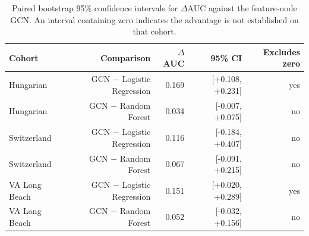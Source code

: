 \begin{table}[t]
\centering
\caption{Paired bootstrap 95\% confidence intervals for $\Delta$AUC against the feature-node GCN. An interval containing zero indicates the advantage is not established on that cohort.}
\label{tab:extbootdelta}
\footnotesize
\begin{tabular}{lrrrr}
\toprule
Cohort & Comparison & $\Delta$AUC & 95\% CI & Excludes zero \\
\midrule
Hungarian & GCN $-$ Logistic Regression & 0.169 & [+0.108, +0.231] & yes \\
Hungarian & GCN $-$ Random Forest & 0.034 & [-0.007, +0.075] & no \\
Switzerland & GCN $-$ Logistic Regression & 0.116 & [-0.184, +0.407] & no \\
Switzerland & GCN $-$ Random Forest & 0.067 & [-0.091, +0.215] & no \\
VA Long Beach & GCN $-$ Logistic Regression & 0.151 & [+0.020, +0.289] & yes \\
VA Long Beach & GCN $-$ Random Forest & 0.052 & [-0.032, +0.156] & no \\
\bottomrule
\end{tabular}
\end{table}
